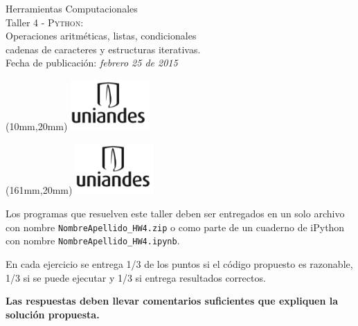 \documentclass[11pt,letterpaper]{exam}
\begin{document}
\begin{center}
{\Large Herramientas Computacionales} \\
Taller 4 - \textsc{Python}:\\
Operaciones aritméticas, listas, condicionales \\
 cadenas de caracteres y estructuras iterativas. \\
Fecha de publicación: {\small \it febrero 25 de 2015}\\
\end{center}

\begin{textblock*}{40mm}(10mm,20mm)
  \includegraphics[width=3cm]{logoUniandes.png}
\end{textblock*}

\begin{textblock*}{40mm}(161mm,20mm)
  \includegraphics[width=3cm]{logoUniandes.png}
\end{textblock*}

\vspace{0.5cm}

Los programas que resuelven este taller deben ser entregados en un solo archivo con nombre \verb+NombreApellido_HW4.zip+ o como parte de un cuaderno de iPython con nombre \verb+NombreApellido_HW4.ipynb+.

En cada ejercicio se entrega 1/3  de los puntos si el código propuesto es razonable, 1/3 si se puede ejecutar y 1/3 si entrega resultados correctos. 

{\bf Las respuestas deben llevar comentarios suficientes que expliquen la solución propuesta.}


\vspace{0.5cm}
\end{document}

